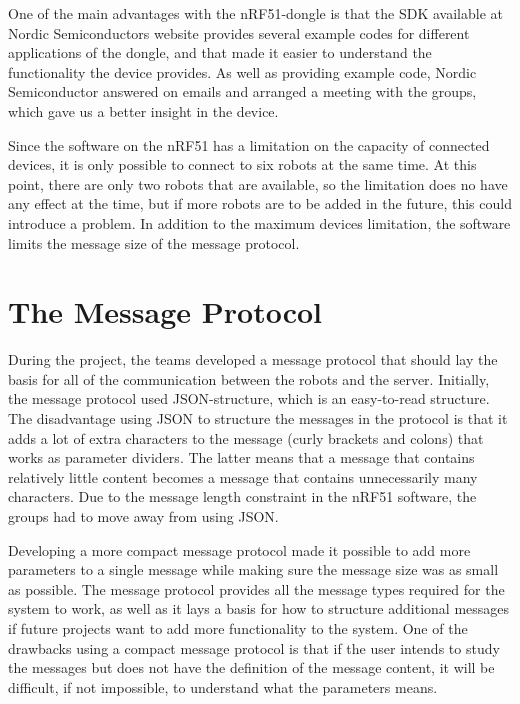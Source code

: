 One of the main advantages with the nRF51-dongle is that the SDK available at Nordic Semiconductors website \cite{nrf51sdk} provides several example codes for different applications of the dongle, and that made it easier to understand the functionality the device provides. As well as providing example code, Nordic Semiconductor answered on emails and arranged a meeting with the groups, which gave us a better insight in the device.

Since the software on the nRF51 has a limitation on the capacity of connected devices, it is only possible to connect to six robots at the same time. At this point, there are only two robots that are available, so the limitation does no have any effect at the time, but if more robots are to be added in the future, this could introduce a problem. In addition to the maximum devices limitation, the software limits the message size of the message protocol.

\section{The Message Protocol}
During the project, the teams developed a message protocol that should lay the basis for all of the communication between the robots and the server. Initially, the message protocol used JSON-structure, which is an easy-to-read structure. The disadvantage using JSON to structure the messages in the protocol is that it adds a lot of extra characters to the message (curly brackets and colons) that works as parameter dividers. The latter means that a message that contains relatively little content becomes a message that contains unnecessarily many characters. Due to the message length constraint in the nRF51 software, the groups had to move away from using JSON.

Developing a more compact message protocol made it possible to add more parameters to a single message while making sure the message size was as small as possible. The message protocol provides all the message types required for the system to work, as well as it lays a basis for how to structure additional messages if future projects want to add more functionality to the system. One of the drawbacks using a compact message protocol is that if the user intends to study the messages but does not have the definition of the message content, it will be difficult, if not impossible, to understand what the parameters means. 
